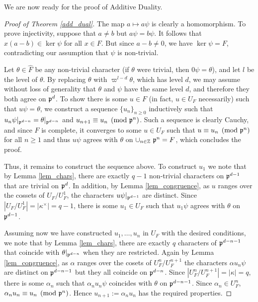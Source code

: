 We are now ready for the proof of Additive Duality.

\begin{proof}[Proof of Theorem \ref{add_dual}]
    The map $a\mapsto a\psi$ is clearly a homomorphism. To prove injectivity, suppose that $a\neq b$ but $a\psi=b\psi$. It follows that $x(a-b)\in\ker\psi$ for all $x\in F$. But since $a-b\neq 0$, we have $\ker\psi=F$, contradicting our assumption that $\psi$ is non-trivial.

    Let $\theta\in\hat{F}$ be any non-trivial character (if $\theta$ were trivial, then $0\psi=\theta$), and let $l$ be the level of $\theta$. By replacing $\theta$ with $\varpi^{l-d}\theta$, which has level $d$, we may assume without loss of generality that $\theta$ and $\psi$ have the same level $d$, and therefore they both agree on $\mathfrak{p}^d$. To show there is some $u\in F$ (in fact, $u\in U_F$ necessarily) such that $u\psi=\theta$,   we construct a sequence $\{u_n\}_{n\geq0}$ inductively such that $u_n\psi|_{\mathfrak{p}^{d-n}}=\theta|_{\mathfrak{p}^{d-n}}$ and $u_{n+1}\equiv u_n\pmod{\mathfrak{p}^n}$. Such a sequence is clearly Cauchy, and since $F$ is complete, it converges to some $u\in U_F$ such that $u\equiv u_n\pmod{\mathfrak{p}^n}$ for all $n\geq 1$ and thus $u\psi$ agrees with $\theta$ on $\cup_{n\in\mathbb{Z}}\ \mathfrak{p}^n=F$, which concludes the proof.

    Thus, it remains to construct the sequence above. To construct $u_1$ we note that by Lemma \ref{lem_chars}, there are exactly $q-1$ non-trivial characters on $\mathfrak{p}^{d-1}$ that are trivial on $\mathfrak{p}^d$. In addition, by Lemma \ref{lem_congruence}, as $u$ ranges over the cossets of $U_F/U_F^1$, the characters $u\psi|_{\mathfrak{p}^{d-1}}$ are distinct. Since $|U_F/U_F^1|=|\kappa^{\times}|=q-1$, there is some $u_1\in U_F$ such that $u_1\psi$ agrees with $\theta$ on $\mathfrak{p}^{d-1}$. 
    
    Assuming now we have constructed $u_1,\ldots,u_n$ in $U_F$ with the desired conditions, we note that by Lemma \ref*{lem_chars}, there are exactly $q$ characters of $\mathfrak{p}^{d-n-1}$ that coincide with $\theta|_{\mathfrak{p}^{d-n}}$ when they are restricted. Again by Lemma \ref*{lem_congruence}, as $\alpha$ ranges over the cosets of $U_F^n/U_F^{n+1}$ the characters $\alpha u_n\psi$ are distinct on $\mathfrak{p}^{d-n-1}$ but they all coincide on $\mathfrak{p}^{d-n}$. Since $|U_F^n/U_F^{n+1}|=|\kappa|=q$, there is some $\alpha_n$ such that $\alpha_n u_n\psi$ coincides with $\theta$ on $\mathfrak{p}^{d-n-1}$. Since $\alpha_n\in U_F^n$, $\alpha_n u_n\equiv u_n\pmod{\mathfrak{p}^n}$. Hence $u_{n+1}:=\alpha_n u_n$ has the required properties.
\end{proof}